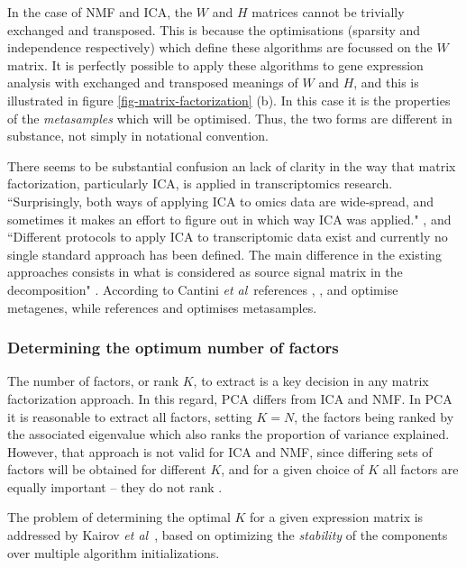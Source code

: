 \documentclass[draft, tikz, 12pt,a4paper,oneside,fleqn]{article}
\newcommand{\etal}{{\em et al\/}}
\begin{document}
In the case of NMF and ICA, the $W$ and $H$ matrices cannot be trivially exchanged and transposed.  This is because the optimisations (sparsity and independence respectively) which define these algorithms are focussed on the $W$ matrix.  It is perfectly possible to apply these algorithms to gene expression analysis with exchanged and transposed meanings of $W$ and $H$, and this is illustrated in figure \ref{fig-matrix-factorization} (b).  In this case it is the properties of the \emph{metasamples} which will be optimised.  Thus, the two forms are different in substance, not simply in notational convention.

There seems to be substantial confusion an lack of clarity in the way that matrix factorization, particularly ICA, is applied in transcriptomics research.  
``Surprisingly, both ways of applying ICA to omics data are wide-spread, and sometimes it makes an effort to figure out in which way ICA was applied." \cite{Sompairac2019}, and ``Different protocols to apply ICA to transcriptomic data exist and currently no single standard approach has been defined. The main difference in the existing approaches consists in what is considered as source signal matrix in the decomposition" \cite{Cantini2019}.  
According to Cantini \etal\, references \cite{Au-Yeung2014}, \cite{Kairov2017}, \cite{Kong2008} and \cite{Lee2003} optimise metagenes, while references \cite{Meng2016} and \cite{Barillot2013} optimises metasamples.


\subsubsection{Determining the optimum number of factors}

The number of factors, or rank $K$, to extract is a key decision in any matrix factorization approach.  In this regard, PCA differs from ICA and NMF.  In PCA it is reasonable to extract all factors, setting $K=N$, the factors being ranked by the associated eigenvalue which also ranks the proportion of variance explained.   However, that approach is not valid for ICA and NMF, since differing sets of factors will be obtained for different $K$, and for a given choice of $K$ all factors are equally important -- they do not rank \cite{Stein-OBrien2018}.

The problem of determining the optimal $K$ for a given expression matrix is addressed  by Kairov \etal\ \cite{Kairov2017}, based on optimizing the \emph{stability} of the components over multiple algorithm initializations.
\end{document}
